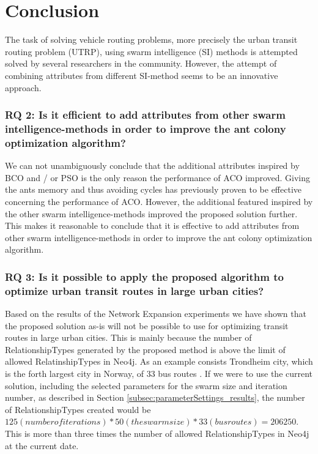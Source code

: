 \section{Conclusion}



The task of solving vehicle routing problems, more precisely the urban transit routing problem (UTRP), using swarm intelligence (SI) methods is attempted solved by several researchers in the community. However, the attempt of combining attributes from different SI-method seems to be an innovative approach. 

\subsubsection*{RQ 2: Is it efficient to add attributes from other swarm intelligence-methods in order to improve the ant colony optimization algorithm?}

We can not unambiguously conclude that the additional attributes inspired by BCO and / or PSO is the only reason the performance of ACO improved. Giving the ants memory and thus avoiding cycles has previously proven to be effective concerning the performance of ACO\citep{dorigo96, sedighpour14, poorzahedy11, salehinejad10}.  However, the additional featured inspired by the other swarm intelligence-methods improved the proposed solution further. This makes it reasonable to conclude that it is effective to add attributes from other swarm intelligence-methods in order to improve the ant colony optimization algorithm.

\subsubsection*{RQ 3: Is it possible to apply the proposed algorithm to optimize urban transit routes in large urban cities?}

Based on the results of the Network Expansion experiments we have shown that the proposed solution as-is will not be possible to use for optimizing transit routes in large urban cities. This is mainly because the number of RelationshipTypes generated by the proposed method is above the limit of allowed RelatinshipTypes in Neo4j. As an example consists Trondheim city, which is the forth largest city in Norway, of 33 bus routes \citep{website:atb-linjenett}. If we were to use the current solution, including the selected parameters for the swarm size and iteration number, as described in Section \vref{subsec:parameterSettings_results}, the number of RelationshipTypes created would be $125 (number of iterations) * 50 (the swarm size) * 33 (bus routes) = 206 250$. This is more than three times the number of allowed RelationshipTypes in Neo4j at the current date. 

